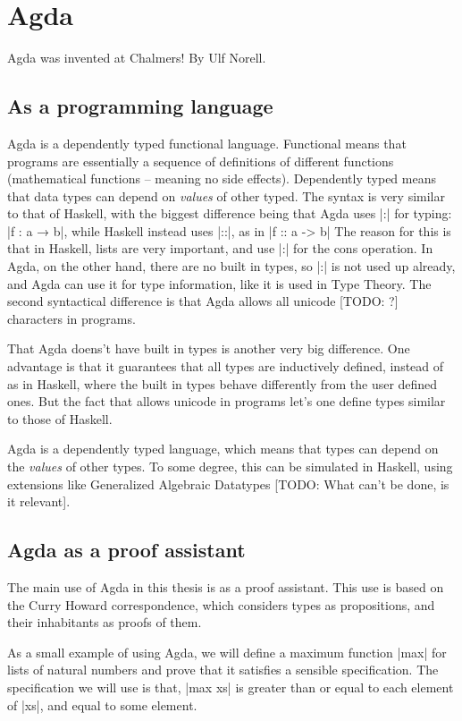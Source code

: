 \section{Agda}
Agda was invented at Chalmers! By Ulf Norell.
\subsection{As a programming language}
Agda is a dependently typed functional language. Functional means that programs are essentially a sequence of definitions of different functions (mathematical functions -- meaning no side effects). Dependently typed means that data types can depend on \emph{values} of other typed. The syntax is very similar to that of Haskell, with the biggest difference being that Agda uses |:| for typing: |f : a → b|, while Haskell instead uses |::|, as in |f :: a -> b|
The reason for this is that in Haskell, lists are very important, and use |:| for the cons operation. In Agda, on the other hand, there are no built in types, so |:| is not used up already, and Agda can use it for type information, like it is used in Type Theory. The second syntactical difference is that Agda allows all unicode [TODO: ?] characters in programs.

That Agda doens't have built in types is another very big difference. One advantage is that it guarantees that all types are inductively defined, instead of as in Haskell, where the built in types behave differently from the user defined ones. But the fact that allows unicode in programs let's one define types similar to those of Haskell.



Agda is a dependently typed language, which means that types can depend on the \emph{values} of other types. To some degree, this can be simulated in Haskell, using extensions like Generalized Algebraic Datatypes [TODO: What can't be done, is it relevant].

\subsection{Agda as a proof assistant}
The main use of Agda in this thesis is as a proof assistant. This use is based on the Curry Howard correspondence, which considers types as propositions, and their inhabitants as proofs of them.

As a small example of using Agda, we will define a maximum function |max| for lists of natural numbers and prove that it satisfies a sensible specification. The specification we will use is that, |max xs| is greater than or equal to each element of |xs|, and equal to some element. 


